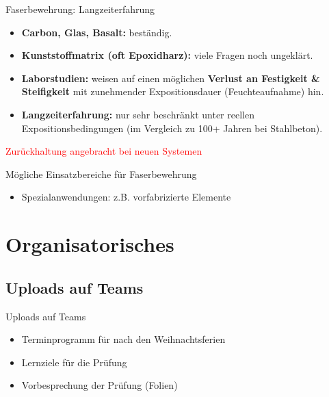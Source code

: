 \begin{frame}{Faserbewehrung: Langzeiterfahrung}
    \vspace{-0.5em} %
    \begin{itemize}
        \item \textbf{Carbon, Glas, Basalt:} beständig.
        \item \textbf{Kunststoffmatrix (oft Epoxidharz):} viele Fragen noch ungeklärt.
        \item \textbf{Laborstudien:} weisen auf einen möglichen \textbf{Verlust an Festigkeit \& Steifigkeit} mit zunehmender Expositionsdauer (Feuchteaufnahme) hin.
        \item \textbf{Langzeiterfahrung:} nur sehr beschränkt unter reellen Expositionsbedingungen (im Vergleich zu 100+ Jahren bei Stahlbeton).
    \end{itemize}
    \vspace{1em}
    \centering \textcolor{red}{\faExclamationCircle{} Zurückhaltung angebracht bei neuen Systemen}
\end{frame}

\begin{frame}{Mögliche Einsatzbereiche für Faserbewehrung}
    \begin{itemize}
        \item[\textbullet] Spezialanwendungen: z.B. vorfabrizierte Elemente
    \end{itemize}

\end{frame}
\folieFragen
\section{Organisatorisches}
\BlueSectionSlide

\subsection{Uploads auf Teams}
\begin{frame}{Uploads auf Teams}
    \begin{itemize}
        \item[\textbullet] Terminprogramm für nach den Weihnachtsferien
        \item[\textbullet] Lernziele für die Prüfung
        \item[\textbullet] Vorbesprechung der Prüfung (Folien)
    \end{itemize}

\end{frame}







